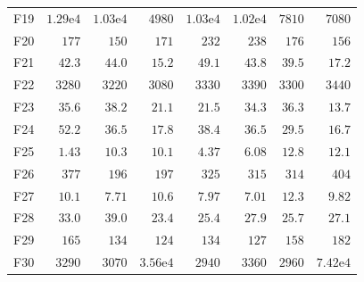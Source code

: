 \begin{tabular}{lrrrrrrr}
F19 & $1.29\mathrm{e}{4}$ & $1.03\mathrm{e}{4}$ & $4980$ & $1.03\mathrm{e}{4}$ & $1.02\mathrm{e}{4}$ & $7810$ & $7080$ \\
F20 & $177$ & $150$ & $171$ & $232$ & $238$ & $176$ & $156$ \\
F21 & $42.3$ & $44.0$ & $\mathbf{15.2}$ & $49.1$ & $43.8$ & $39.5$ & $17.2$ \\
F22 & $3280$ & $3220$ & $3080$ & $3330$ & $3390$ & $3300$ & $3440$ \\
F23 & $35.6$ & $38.2$ & $21.1$ & $21.5$ & $34.3$ & $36.3$ & $13.7$ \\
F24 & $52.2$ & $36.5$ & $17.8$ & $38.4$ & $36.5$ & $29.5$ & $16.7$ \\
F25 & $1.43$ & $10.3$ & $10.1$ & $4.37$ & $6.08$ & $12.8$ & $12.1$ \\
F26 & $377$ & $196$ & $197$ & $325$ & $315$ & $314$ & $404$ \\
F27 & $10.1$ & $7.71$ & $10.6$ & $7.97$ & $7.01$ & $12.3$ & $9.82$ \\
F28 & $33.0$ & $39.0$ & $23.4$ & $25.4$ & $27.9$ & $25.7$ & $27.1$ \\
F29 & $165$ & $134$ & $124$ & $134$ & $127$ & $158$ & $182$ \\
F30 & $3290$ & $3070$ & $3.56\mathrm{e}{4}$ & $2940$ & $3360$ & $2960$ & $7.42\mathrm{e}{4}$ \\
\bottomrule
\end{tabular}
